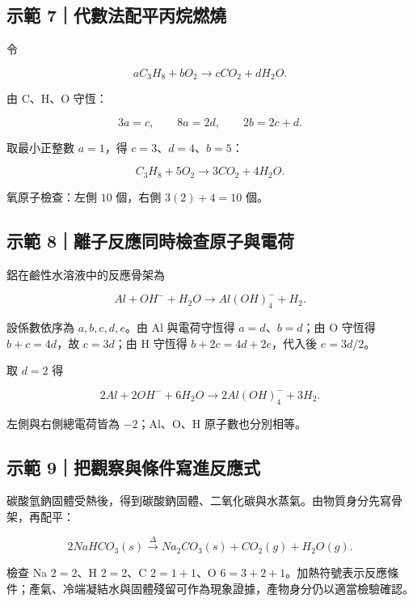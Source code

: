 \documentclass[11pt,a4paper]{article}
\begin{document}
\begin{HandoutWorkedExample}

\subsection{示範 7｜代數法配平丙烷燃燒}\label{ux793aux7bc4-7ux4ee3ux6578ux6cd5ux914dux5e73ux4e19ux70f7ux71c3ux71d2}

令

\[
aC_3H_8+bO_2\rightarrow cCO_2+dH_2O.
\]

由 C、H、O 守恆：

\[
3a=c,
\qquad 8a=2d,
\qquad 2b=2c+d.
\]

取最小正整數 \(a=1\)，得 \(c=3\)、\(d=4\)、\(b=5\)：

\[
\boxed{C_3H_8+5O_2\rightarrow3CO_2+4H_2O}.
\]

氧原子檢查：左側 \(10\) 個，右側 \(3(2)+4=10\) 個。

\end{HandoutWorkedExample}

\begin{HandoutWorkedExample}

\subsection{示範 8｜離子反應同時檢查原子與電荷}\label{ux793aux7bc4-8ux96e2ux5b50ux53cdux61c9ux540cux6642ux6aa2ux67e5ux539fux5b50ux8207ux96fbux8377}

鋁在鹼性水溶液中的反應骨架為

\[
Al+OH^-+H_2O\rightarrow Al(OH)_4^-+H_2.
\]

設係數依序為 \(a,b,c,d,e\)。由 Al 與電荷守恆得 \(a=d\)、\(b=d\)；由 O 守恆得 \(b+c=4d\)，故 \(c=3d\)；由 H 守恆得 \(b+2c=4d+2e\)，代入後 \(e=3d/2\)。

取 \(d=2\) 得

\[
\boxed{2Al+2OH^-+6H_2O\rightarrow2Al(OH)_4^-+3H_2}.
\]

左側與右側總電荷皆為 \(-2\)；Al、O、H 原子數也分別相等。

\end{HandoutWorkedExample}

\begin{HandoutWorkedExample}

\subsection{示範 9｜把觀察與條件寫進反應式}\label{ux793aux7bc4-9ux628aux89c0ux5bdfux8207ux689dux4ef6ux5bebux9032ux53cdux61c9ux5f0f}

碳酸氫鈉固體受熱後，得到碳酸鈉固體、二氧化碳與水蒸氣。由物質身分先寫骨架，再配平：

\[
\boxed{2NaHCO_3(s)\xrightarrow{\Delta}Na_2CO_3(s)+CO_2(g)+H_2O(g)}.
\]

檢查 Na \(2=2\)、H \(2=2\)、C \(2=1+1\)、O \(6=3+2+1\)。加熱符號表示反應條件；產氣、冷端凝結水與固體殘留可作為現象證據，產物身分仍以適當檢驗確認。

\end{HandoutWorkedExample}
\end{document}
